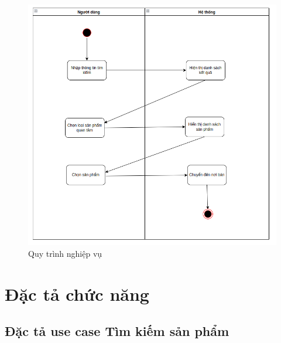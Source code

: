 \documentclass[../DoAn.tex]{subfiles}
\begin{document}
\begin{figure}[H]
    \centering
    \includegraphics[scale=0.6]{Hinhve/quytrinhnghiepvu.png}
    \caption{Quy trình nghiệp vụ}
    \label{fig:my_label2}
\end{figure}

\section{Đặc tả chức năng}
\label{section:2.3}

\subsection{Đặc tả use case Tìm kiếm sản phẩm}
\end{document}
